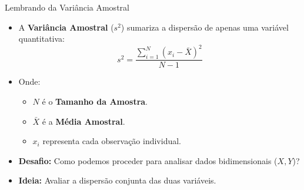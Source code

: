 \begin{frame}{Lembrando da Variância Amostral}
    \begin{itemize}
        \item A \textbf{Variância Amostral} ($s^2$) sumariza a dispersão de apenas uma variável quantitativa:
        $$s^2 = \frac{\sum_{i=1}^N (x_i - \bar{X})^2}{N - 1}$$
        \item Onde:
        \begin{itemize}
            \item $N$ é o \textbf{Tamanho da Amostra}.
            \item $\bar{X}$ é a \textbf{Média Amostral}.
            \item $x_i$ representa cada observação individual.
        \end{itemize}
        \item \textbf{Desafio:} Como podemos proceder para analisar dados bidimensionais ($X, Y$)?
        \item \textbf{Ideia:} Avaliar a dispersão conjunta das duas variáveis.
    \end{itemize}
\end{frame}

